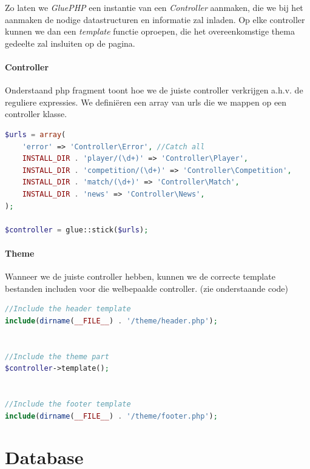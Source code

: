 \documentclass[11pt]{article}
\begin{document}
Zo laten we \emph{GluePHP} een instantie van een \emph{Controller} aanmaken, die we bij het aanmaken de nodige datastructuren en informatie zal inladen. Op elke controller kunnen we dan een \emph{template} functie oproepen, die het overeenkomstige thema gedeelte zal insluiten op de pagina.



\paragraph{Controller} Onderstaand php fragment toont hoe we de juiste controller verkrijgen a.h.v. de reguliere expressies. We defini\"eren een array van urls die we mappen op een controller klasse.


\begin{framed}
\begin{lstlisting}[language=php]
$urls = array(
	'error' => 'Controller\Error', //Catch all
	INSTALL_DIR . 'player/(\d+)' => 'Controller\Player',
	INSTALL_DIR . 'competition/(\d+)' => 'Controller\Competition',
	INSTALL_DIR . 'match/(\d+)' => 'Controller\Match',
	INSTALL_DIR . 'news' => 'Controller\News',
);

$controller = glue::stick($urls);
\end{lstlisting}
\end{framed}



\paragraph{Theme} Wanneer we de juiste controller hebben, kunnen we de correcte template bestanden includen voor die welbepaalde controller. (zie onderstaande code)


\begin{framed}
\begin{lstlisting}[language=php]
//Include the header template
include(dirname(__FILE__) . '/theme/header.php');


//Include the theme part
$controller->template();


//Include the footer template
include(dirname(__FILE__) . '/theme/footer.php');
\end{lstlisting}
\end{framed}



\section{Database}
\end{document}
